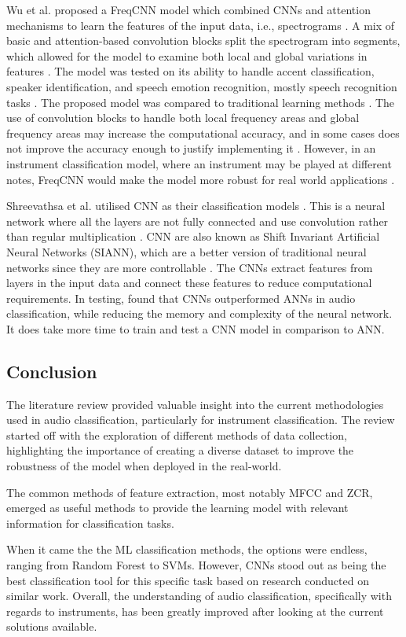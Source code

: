 \documentclass[class=report,11pt,crop=false]{standalone}
\begin{document}
Wu et al. proposed a FreqCNN model which combined CNNs and attention mechanisms to learn the features of the input data, i.e., spectrograms  \cite{Wu_2018}. A mix of basic and attention-based convolution blocks split the spectrogram into segments, which allowed for the model to examine both local and global variations in features  \cite{Wu_2018}. The model was tested on its ability to handle accent classification, speaker identification, and speech emotion recognition, mostly speech recognition tasks  \cite{Wu_2018}. The proposed model was compared to traditional learning methods  \cite{Wu_2018}. The use of convolution blocks to handle both local frequency areas and global frequency areas may increase the computational accuracy, and in some cases does not improve the accuracy enough to justify implementing it  \cite{Wu_2018}. However, in an instrument classification model, where an instrument may be played at different notes, FreqCNN would make the model more robust for real world applications  \cite{Wu_2018}. 

Shreevathsa et al. utilised CNN as their classification models \cite{Shreevathsa_2020}. This is a neural network where all the layers are not fully connected and use convolution rather than regular multiplication \cite{Shreevathsa_2020}. CNN are also known as Shift Invariant Artificial Neural Networks (SIANN), which are a better version of traditional neural networks since they are more controllable \cite{Shreevathsa_2020}.  The CNNs extract features from layers in the input data and connect these features to reduce computational requirements. In testing, \cite{Shreevathsa_2020} found that CNNs outperformed ANNs in audio classification, while reducing the memory and complexity of the neural network. It does take more time to train and test a CNN model in comparison to ANN. 

\subsection{Conclusion}
The literature review provided valuable insight into the current methodologies used in audio classification, particularly for instrument  classification. The review started off with the exploration of different methods of data collection, highlighting the importance of creating a diverse dataset to improve the robustness of the model when deployed in the real-world.  

The common methods of feature extraction, most notably MFCC and ZCR, emerged as useful methods to provide the learning model with relevant information for classification tasks. 

When it came the the ML classification methods, the options were endless, ranging from Random Forest to SVMs. However, CNNs stood out as being the best classification tool for this specific task based on research conducted on similar work.  Overall, the understanding of audio classification, specifically with regards to instruments, has been greatly improved after looking at the current solutions available. 


\ifstandalone

\printnoidxglossary[type=\acronymtype,nonumberlist]
\fi
\end{document}
